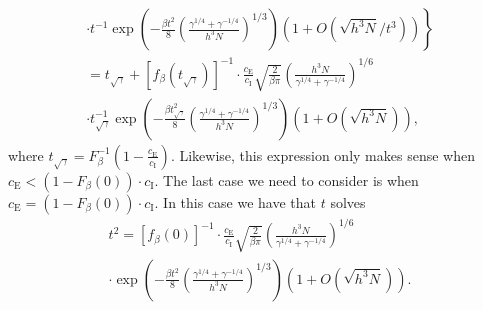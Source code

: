 \documentclass[final]{IEEEtran} %
\newcommand{\ce}{c_\text{E}}
\newcommand{\ci}{c_\text{I}}
\begin{document}
\begin{IEEEproof}
\begin{multline*}
    \cdot
    \left . t^{-1}
           \exp \!
           \left(
               -\frac{\beta t^2}{8}
               \left(
                   \frac{\gamma^{1/4} + \gamma^{-1/4}}{ h^3 N }
               \right)^{\!1/3}
           \right) \!
           \left(
               1 + O\left(\sqrt{h^3 N}/t^3 \right)
           \right) \!
       \right\}
    \\ \!\!\!
    = t_{\sqrt{\gamma}}
       +
       \left[
           f_\beta \left( t_{\sqrt{\gamma}} \right)
       \right]^{-1}
       \cdot
       \frac{\ce}{\ci}
       \sqrt{\frac{2}{\beta \pi}}
       \left(
           \frac{ h^3 N }{\gamma^{1/4} + \gamma^{-1/4}}
       \right)^{1/6}
    \\
    \cdot t_{\sqrt{\gamma}}^{-1}
       \exp
       \left(
           -\frac{\beta t_{\sqrt{\gamma}}^2}{8}
           \left(
               \frac{\gamma^{1/4} + \gamma^{-1/4}}{ h^3 N }
           \right)^{1/3}
       \right)
       \left(
           1 + O\left(\sqrt{h^3 N} \right)
       \right) ,
\end{multline*}
where $t_{\sqrt{\gamma}} = F_\beta^{-1} \left( 1 - \frac{\ce}{\ci} \right)$.
Likewise, this expression only makes sense when
$\ce < (1 - F_\beta(0)) \cdot \ci$.  The last case we need to consider is
when $\ce = (1 - F_\beta(0)) \cdot \ci$.  In this case we have that $t$
solves
\begin{multline*}
    t^2
    =
    \left[
           f_\beta ( 0 )
    \right]^{-1}
    \cdot
    \frac{\ce}{\ci}
    \sqrt{\frac{2}{\beta \pi}}
    \left(
        \frac{ h^3 N }{\gamma^{1/4} + \gamma^{-1/4}}
    \right)^{1/6}
    \\
    \cdot   \exp
       \left(
           -\frac{\beta t^2}{8}
           \left(
               \frac{\gamma^{1/4} + \gamma^{-1/4}}{ h^3 N }
           \right)^{1/3}
       \right)
       \left(
           1 + O\left(\sqrt{h^3 N} \right)
       \right).
\end{multline*}
\end{IEEEproof}
\end{document}
